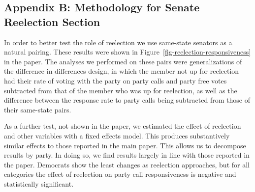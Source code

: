 \documentclass[12pt]{article}
\begin{document}
\clearpage

\subsection*{Appendix B: Methodology for Senate Reelection Section}
%

In order to better test the role of reelection we use same-state senators as a natural pairing. These results were shown in Figure~\ref{fig-reelection-responsiveness} in the paper. The analyses we performed on these pairs were generalizations of the difference in differences design, in which the member not up for reelection had their rate of voting with the party on party calls and party free votes subtracted from that of the member who was up for reelection, as well as the difference between the response rate to party calls being subtracted from those of their same-state pairs.

As a further test, not shown in the paper, we estimated the effect of reelection and other variables with a fixed effects model. This produces substantively similar effects to those reported in the main paper. This allows us to decompose results by party. In doing so, we find results largely in line with those reported in the paper. Democrats show the least changes as reelection approaches, but for all categories the effect of reelection on party call responsiveness is negative and statistically significant.
\end{document}
